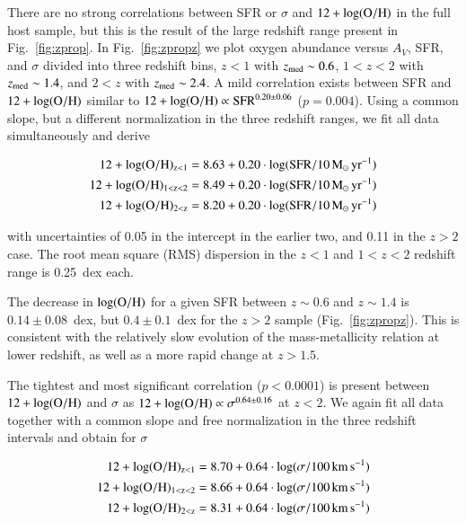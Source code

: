 \documentclass[traditabstract, longauth]{aa}
\newcommand{\oh}{12+\log(\rm{O/H})}
\begin{document}
There are no strong correlations between SFR or $\sigma$ and $\oh$ in the full host sample, but this is the result of the large redshift range present in Fig.~\ref{fig:zprop}. In Fig.~\ref{fig:zpropz} we plot oxygen abundance versus $A_V$, SFR, and $\sigma$ divided into three redshift bins, $z<1$ with $z_{\rm{med}}\sim0.6$, $1<z<2$ with $z_{\rm{med}}\sim1.4$, and $2<z$ with $z_{\rm{med}}\sim2.4$. A mild correlation exists between SFR and $\oh$ similar to $\oh\propto\mathrm{SFR}^{0.20\pm0.06}$ ($p=0.004$). Using a common slope, but a different normalization in the three redshift ranges, we fit all data simultaneously and derive

\begin{equation}
\label{eq:ohsfr}
\begin{split}
\oh_{z<1} = 8.63 + 0.20\cdot \log(\rm{SFR/10\,M_\odot\,yr^{-1}}) \\
\oh_{1<z<2} = 8.49 + 0.20\cdot \log(\rm{SFR/10\,M_\odot\,yr^{-1}})  \\
\oh_{2<z} = 8.20 + 0.20\cdot \log(\rm{SFR/10\,M_\odot\,yr^{-1}})  \\
\end{split}
\end{equation}

 {with uncertainties of 0.05 in the intercept in the earlier two, and 0.11 in the $z>2$ case. The root mean square (RMS) dispersion in the $z<1$ and $1<z<2$ redshift range is 0.25~dex each.}

The decrease in $\log(\rm{O/H})$ for a given SFR between $z\sim0.6$ and $z\sim1.4$ is $0.14\pm0.08$~dex, but $0.4\pm0.1$~dex for the $z > 2$ sample (Fig.~\ref{fig:zpropz}). This is consistent with the relatively slow evolution of the mass-metallicity relation at lower redshift, as well as a more rapid change at $z > 1.5$. 

The tightest and most significant correlation ($p<0.0001$) is present between $\oh$ and $\sigma$ as $\oh\propto\sigma^{0.64\pm0.16}$ at $z<2$. We again fit all data together with a common slope and free normalization in the three redshift intervals and obtain for $\sigma$

\begin{equation}
\label{eq:ohsigma}
\begin{split}
\oh_{z<1} = 8.70 + 0.64\cdot \log(\sigma/\rm{100\,km\,s^{-1}}) \\
\oh_{1<z<2} = 8.66 + 0.64\cdot \log(\sigma/\rm{100\,km\,s^{-1}}) \\
\oh_{2<z} = 8.31 + 0.64\cdot \log(\sigma/\rm{100\,km\,s^{-1}})
\end{split}
\end{equation}
\end{document}
